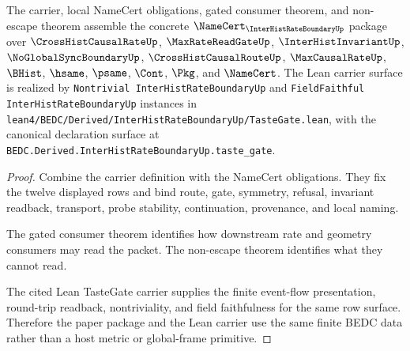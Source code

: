\begin{theorem}
\label{thm:inter-hist-rate-boundary-namecert-package}
The carrier, local NameCert obligations, gated consumer theorem, and non-escape theorem assemble the concrete $\NameCert_{\InterHistRateBoundaryUp}$ package over $\CrossHistCausalRateUp$, $\MaxRateReadGateUp$, $\InterHistInvariantUp$, $\NoGlobalSyncBoundaryUp$, $\CrossHistCausalRouteUp$, $\MaxCausalRateUp$, $\BHist$, $\hsame$, $\psame$, $\Cont$, $\Pkg$, and $\NameCert$. The Lean carrier surface is realized by \texttt{Nontrivial InterHistRateBoundaryUp} and \texttt{FieldFaithful InterHistRateBoundaryUp} instances in \texttt{lean4/BEDC/Derived/InterHistRateBoundaryUp/TasteGate.lean}, with the canonical declaration surface at \texttt{BEDC.Derived.InterHistRateBoundaryUp.taste\_gate}.
\end{theorem}
\begin{proof}
Combine the carrier definition with the NameCert obligations. They fix the twelve displayed rows and bind route, gate, symmetry, refusal, invariant readback, transport, probe stability, continuation, provenance, and local naming.

The gated consumer theorem identifies how downstream rate and geometry consumers may read the packet. The non-escape theorem identifies what they cannot read.

The cited Lean TasteGate carrier supplies the finite event-flow presentation, round-trip readback, nontriviality, and field faithfulness for the same row surface. Therefore the paper package and the Lean carrier use the same finite BEDC data rather than a host metric or global-frame primitive.
\end{proof}

\begin{closurestatus}{\InterHistRateBoundaryUp}
  \theoryclosure{\seedClosure}
  \formalstatus{\unformalizedV}
\end{closurestatus}
